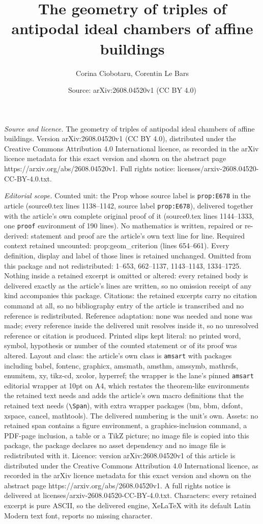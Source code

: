 \documentclass[10pt,a4paper]{amsart}
\title[The geometry of triples of antipodal ideal chambers of affin]{The geometry of triples of antipodal ideal chambers of affine buildings}
\author{Corina Ciobotaru, Corentin Le Bars}
\date{Source: arXiv:2608.04520v1 (CC BY 4.0)}
\begin{document}
\maketitle

\noindent\emph{Source and licence.} The geometry of triples of antipodal ideal chambers of affine buildings. Version arXiv:2608.04520v1 (CC BY 4.0), distributed under the Creative Commons Attribution 4.0 International licence, as recorded in the arXiv licence metadata for this exact version and shown on the abstract page https://arxiv.org/abs/2608.04520v1. Full rights notice: licenses/arxiv-2608.04520-CC-BY-4.0.txt.\par\smallskip

\noindent\textit{Editorial scope.} Counted unit: the Prop whose source label is \texttt{prop:E678} in the article (source0.tex lines 1138--1142, source label \texttt{prop:E678}), delivered together with the article's own complete original proof of it (source0.tex lines 1144--1333, one \texttt{proof} environment of 190 lines). No mathematics is written, repaired or re-derived: statement and proof are the article's own text line for line. Required context retained uncounted: prop:geom\_criterion (lines 654--661). Every definition, display and label of those lines is retained unchanged. Omitted from this package and not redistributed: 1--653, 662--1137, 1143--1143, 1334--1725. Nothing inside a retained excerpt is omitted or altered: every retained body is delivered exactly as the article's lines are written, so no omission receipt of any kind accompanies this package. Citations: the retained excerpts carry no citation command at all, so no bibliography entry of the article is transcribed and no reference is redistributed. Reference adaptation: none was needed and none was made; every reference inside the delivered unit resolves inside it, so no unresolved reference or citation is produced. Printed slips kept literal: no printed word, symbol, hypothesis or number of the counted statement or of its proof was altered. Layout and class: the article's own class is \texttt{amsart} with packages including babel, fontenc, graphicx, amsmath, amsthm, amssymb, mathrsfs, enumitem, xy, tikz-cd, xcolor, hyperref; the wrapper is the lane's pinned \texttt{amsart} editorial wrapper at 10pt on A4, which restates the theorem-like environments the retained text needs and adds the article's own macro definitions that the retained text needs (\texttt{\textbackslash Span}), with extra wrapper packages (bm, bbm, dsfont, xspace, cancel, mathtools). The delivered numbering is the unit's own. Assets: no retained span contains a figure environment, a graphics-inclusion command, a PDF-page inclusion, a table or a TikZ picture; no image file is copied into this package, the package declares no asset dependency and no image file is redistributed with it. Licence: version arXiv:2608.04520v1 of this article is distributed under the Creative Commons Attribution 4.0 International licence, as recorded in the arXiv licence metadata for this exact version and shown on the abstract page https://arxiv.org/abs/2608.04520v1. A full rights notice is delivered at licenses/arxiv-2608.04520-CC-BY-4.0.txt. Characters: every retained excerpt is pure ASCII, so the delivered engine, XeLaTeX with its default Latin Modern text font, reports no missing character.
\end{document}
